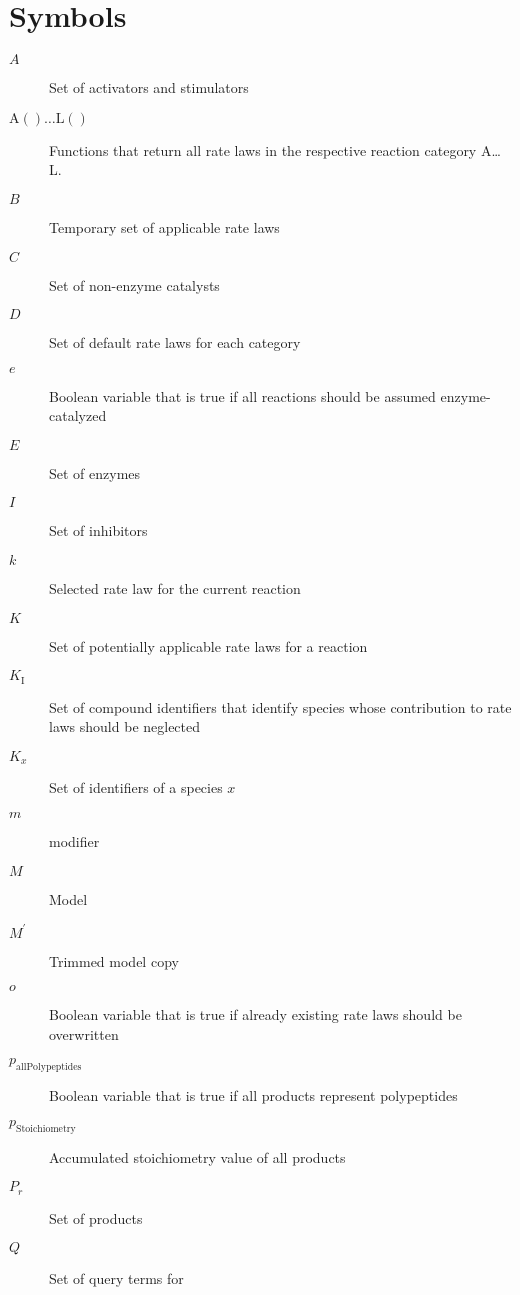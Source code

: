 \chapter{Symbols}
\begin{description}
\item[$A$]                 Set of activators and stimulators
\item[$\mathrm{A}()\ldots \mathrm{L}()$]      Functions that return all rate laws in the respective reaction category A\ldots L.
\item[$B$]                 Temporary set of applicable rate laws
\item[$C$]                 Set of non-enzyme catalysts
\item[$D$]                 Set of default rate laws for each category
\item[$e$]                 Boolean variable that is true if all reactions should be assumed enzyme-catalyzed
\item[$E$]                 Set of enzymes
\item[$I$]                 Set of inhibitors
\item[$k$]                 Selected rate law for the current reaction
\item[$K$]                 Set of potentially applicable rate laws for a reaction
\item[$K_\mathrm{I}$]               Set of \KEGG compound identifiers that identify species whose contribution to rate laws should be neglected 
\item[$K_x$]               Set of \KEGG identifiers of a species $x$
\item[$m$]                 modifier
\item[$M$]                 Model
\item[$M^\prime$]          Trimmed model copy
\item[$o$]                 Boolean variable that is true if already existing rate laws should be overwritten
\item[$p_\mathrm{allPolypeptides}$] Boolean variable that is true if all products represent polypeptides
\item[$p_\mathrm{Stoichiometry}$]   Accumulated stoichiometry value of all products
\item[$P_r$]               Set of products
\item[$Q$]                Set of query terms for \SABIO

\end{description}
